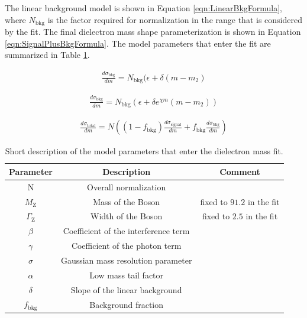 \documentclass{cmspaper}
\begin{document}
The linear background model is shown in Equation \ref{eqn:LinearBkgFormula}, where $N_{\mathrm{bkg}}$ is the factor required for normalization in the range that is considered by the fit. The final dielectron mass shape parameterization is shown in Equation \ref{eqn:SignalPlusBkgFormula}. The model parameters that enter the fit are summarized in Table \ref{tab:ZeeFitParameters}. 




\begin{eqnarray}
  \label{eqn:LinearBkgFormula} 
\frac{d\sigma_{\mathrm{bkg}}}{dm} = N_{\mathrm{bkg}}(\epsilon + \delta (m - m_{2} )
\end{eqnarray}

\begin{eqnarray}
  \label{eqn:ExponentialBkgFormula} 
\frac{d\sigma_{\mathrm{bkg}}}{dm} = N_{\mathrm{bkg}}(\epsilon + \delta e^{\chi m}(m - m_{2}))
\end{eqnarray}


\begin{eqnarray}
  \label{eqn:SignalPlusBkgFormula} 
\frac{d\sigma_{\mathrm{total}}}{dm} = N\left((1-f_{\mathrm{bkg}})\frac{d\sigma_{\mathrm{signal}}}{dm} + f_{\mathrm{bkg}} \frac{d\sigma_{\mathrm{bkg}}}{dm} \right)
\end{eqnarray}


\begin{table}[!ht]
\begin{center}
\begin{tabular}{|c|c|c|}
\hline
 Parameter & Description & Comment \\
\hline
N                          & Overall normalization                 & \\
$M_{\mathrm{Z}}$           & Mass of the \Z Boson                  & fixed to $91.2$ in the fit\\
$\Gamma_{\mathrm{Z}}$      & Width of the \Z Boson                 & fixed to $2.5$ in the fit\\
$\beta$                    & Coefficient of the interference term  & \\
$\gamma$                   & Coefficient of the photon term        & \\
$\sigma$                   & Gaussian mass resolution parameter    & \\
$\alpha$                   & Low mass tail factor                  & \\
$\delta$                   & Slope of the linear background        & \\
$f_{\mathrm{bkg}}$         & Background fraction                   & \\
\hline                               
\end{tabular}
\caption{Short description of the model parameters that enter the dielectron mass fit. \label{tab:ZeeFitParameters}}
\end{center}
\end{table}
\end{document}
